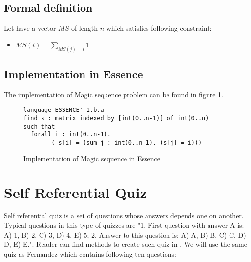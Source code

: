 \subsection{Formal definition}
Let have a vector $MS$ of length $n$ which satisfies following constraint:

\begin{itemize}
\item $MS(i)= \sum_{MS(j)=i} 1$
\end{itemize}

\subsection{Implementation in Essence}
The implementation of Magic sequence problem can be found in figure \ref{ms-essence-implementation}.



\lstset{         %
  language=C++,
	basicstyle=\tiny,
  keywordstyle=\bfseries,
  identifierstyle=\itshape,
  stringstyle=\ttfamily,
  numbers=none,
  numberstyle=\tiny,
  numbersep=5pt,
  frameround=ffff,
  extendedchars=true,
  tab=~,
  tabsize=2,
  frame=single,
  captionpos=b,
  showspaces=false,
  showstringspaces=false,
  breaklines=true
}


\begin{figure}[ht]
\caption{\label{ms-essence-implementation}Implementation of Magic sequence in Essence}
\begin{lstlisting}
language ESSENCE' 1.b.a
find s : matrix indexed by [int(0..n-1)] of int(0..n)
such that
  forall i : int(0..n-1).
        ( s[i] = (sum j : int(0..n-1). (s[j] = i)))
\end{lstlisting} 
\end{figure}
        
\section{Self Referential Quiz}

Self referential quiz is a set of questions whose answers depends one on another. Typical questions in this type of quizzes are "1. First question with answer A is: A) 1, B) 2, C) 3, D) 4, E) 5; 2. Answer to this question is: A) A, B) B, C) C, D) D, E) E.". Reader can find methods to create such quiz in \cite{jios:bubalo}. We will use the same quiz as Fernandez which contains following ten questions:

